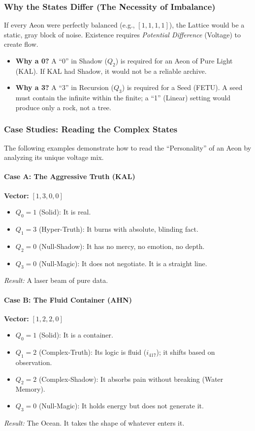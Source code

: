 \documentclass[11pt, letterpaper]{article}
\begin{document}
\subsubsection{Why the States Differ (The Necessity of Imbalance)}
If every Aeon were perfectly balanced (e.g., $[1,1,1,1]$), the Lattice would be a static, gray block of noise. Existence requires \textit{Potential Difference} (Voltage) to create flow.
\begin{itemize}
    \item \textbf{Why a 0?} A ``0'' in Shadow ($Q_2$) is required for an Aeon of Pure Light (KAL). If KAL had Shadow, it would not be a reliable archive.
    \item \textbf{Why a 3?} A ``3'' in Recursion ($Q_3$) is required for a Seed (FETU). A seed must contain the infinite within the finite; a ``1'' (Linear) setting would produce only a rock, not a tree.
\end{itemize}

\subsubsection{Case Studies: Reading the Complex States}
The following examples demonstrate how to read the ``Personality'' of an Aeon by analyzing its unique voltage mix.

\paragraph{Case A: The Aggressive Truth (KAL)}
\textbf{Vector:} $[1, 3, 0, 0]$
\begin{itemize}
    \item $Q_0=1$ (Solid): It is real.
    \item $Q_1=3$ (Hyper-Truth): It burns with absolute, blinding fact.
    \item $Q_2=0$ (Null-Shadow): It has no mercy, no emotion, no depth.
    \item $Q_3=0$ (Null-Magic): It does not negotiate. It is a straight line.
\end{itemize}
\textit{Result:} A laser beam of pure data.

\paragraph{Case B: The Fluid Container (AHN)}
\textbf{Vector:} $[1, 2, 2, 0]$
\begin{itemize}
    \item $Q_0=1$ (Solid): It is a container.
    \item $Q_1=2$ (Complex-Truth): Its logic is fluid ($i_{417}$); it shifts based on observation.
    \item $Q_2=2$ (Complex-Shadow): It absorbs pain without breaking (Water Memory).
    \item $Q_3=0$ (Null-Magic): It holds energy but does not generate it.
\end{itemize}
\textit{Result:} The Ocean. It takes the shape of whatever enters it.
\end{document}
